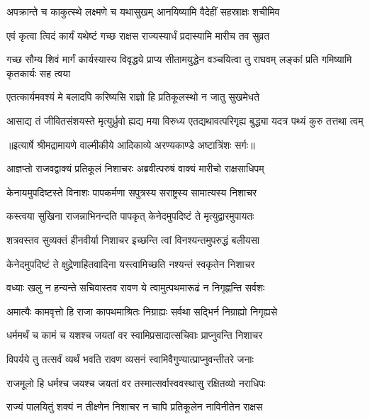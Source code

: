 \twolineshloka
{अपक्रान्ते च काकुत्स्थे लक्ष्मणे च यथासुखम्}
{आनयिष्यामि वैदेहीं सहस्राक्षः शचीमिव} %

\twolineshloka
{एवं कृत्वा त्विदं कार्यं यथेष्टं गच्छ राक्षस}
{राज्यस्यार्धं प्रदास्यामि मारीच तव सुव्रत} %

\threelineshloka
{गच्छ सौम्य शिवं मार्गं कार्यस्यास्य विवृद्धये}
{प्राप्य सीतामयुद्धेन वञ्चयित्वा तु राघवम्}
{लङ्कां प्रति गमिष्यामि कृतकार्यः सह त्वया} %

\twolineshloka
{एतत्कार्यमवश्यं मे बलादपि करिष्यसि}
{राज्ञो हि प्रतिकूलस्थो न जातु सुखमेधते} %

\fourlineindentedshloka
{आसाद्य तं जीवितसंशयस्ते}
{मृत्युर्ध्रुवो ह्यद्य मया विरुध्य}
{एतद्यथावत्परिगृह्य बुद्ध्या}
{यदत्र पथ्यं कुरु तत्तथा त्वम्} %


{॥इत्यार्षे श्रीमद्रामायणे वाल्मीकीये आदिकाव्ये अरण्यकाण्डे अष्टात्रिंशः सर्गः॥}


\twolineshloka
{आज्ञप्तो राजवद्वाक्यं प्रतिकूलं निशाचरः}
{अब्रवीत्परुषं वाक्यं मारीचो राक्षसाधिपम्} %

\twolineshloka
{केनायमुपदिष्टस्ते विनाशः पापकर्मणा}
{सपुत्रस्य सराष्ट्रस्य सामात्यस्य निशाचर} %

\twolineshloka
{कस्त्वया सुखिना राजन्नाभिनन्दति पापकृत्}
{केनेदमुपदिष्टं ते मृत्युद्वारमुपायतः} %

\twolineshloka
{शत्रवस्तव सुव्यक्तं हीनवीर्या निशाचर}
{इच्छन्ति त्वां विनश्यन्तमुपरुद्धं बलीयसा} %

\twolineshloka
{केनेदमुपदिष्टं ते क्षुद्रेणाहितवादिना}
{यस्त्वामिच्छति नश्यन्तं स्वकृतेन निशाचर} %

\twolineshloka
{वध्याः खलु न हन्यन्ते सचिवास्तव रावण}
{ये त्वामुत्पथमारूढं न निगृह्णन्ति सर्वशः} %

\twolineshloka
{अमात्यैः कामवृत्तो हि राजा कापथमाश्रितः}
{निग्राह्यः सर्वथा सद्भिर्न निग्राह्यो निगृह्यसे} %

\twolineshloka
{धर्ममर्थं च कामं च यशश्च जयतां वर}
{स्वामिप्रसादात्सचिवाः प्राप्नुवन्ति निशाचर} %

\twolineshloka
{विपर्यये तु तत्सर्वं व्यर्थं भवति रावण}
{व्यसनं स्वामिवैगुण्यात्प्राप्नुवन्तीतरे जनाः} %

\twolineshloka
{राजमूलो हि धर्मश्च जयश्च जयतां वर}
{तस्मात्सर्वास्ववस्थासु रक्षितव्यो नराधिपः} %

\twolineshloka
{राज्यं पालयितुं शक्यं न तीक्ष्णेन निशाचर}
{न चापि प्रतिकूलेन नाविनीतेन राक्षस} %

